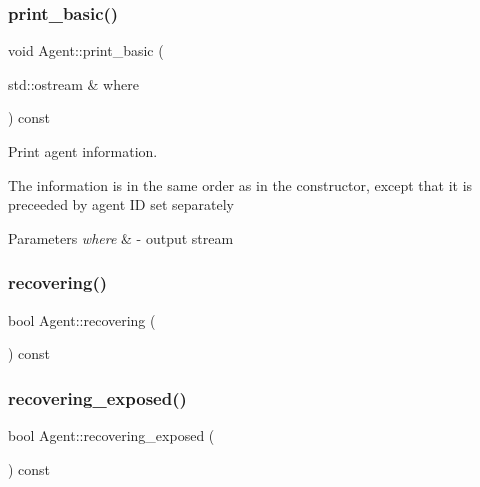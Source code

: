 \subsubsection{\texorpdfstring{print\+\_\+basic()}{print\_basic()}}
{\footnotesize\ttfamily void Agent\+::print\+\_\+basic (\begin{DoxyParamCaption}\item[{std\+::ostream \&}]{where }\end{DoxyParamCaption}) const}



Print agent information. 

The information is in the same order as in the constructor, except that it is preceeded by agent ID set separately 
\begin{DoxyParams}{Parameters}
{\em where} & -\/ output stream \\
\hline
\end{DoxyParams}
\mbox{\label{classAgent_adbe591f0156d55ec1eca37a7d9f75fe4}} 
\subsubsection{\texorpdfstring{recovering()}{recovering()}}
{\footnotesize\ttfamily bool Agent\+::recovering (\begin{DoxyParamCaption}{ }\end{DoxyParamCaption}) const\hspace{0.3cm}{\ttfamily [inline]}}

\mbox{\label{classAgent_a221f1afb3791e0f0fa9eaccaea2d00cb}} 
\subsubsection{\texorpdfstring{recovering\+\_\+exposed()}{recovering\_exposed()}}
{\footnotesize\ttfamily bool Agent\+::recovering\+\_\+exposed (\begin{DoxyParamCaption}{ }\end{DoxyParamCaption}) const\hspace{0.3cm}{\ttfamily [inline]}}

\mbox{\label{classAgent_ab04af1e2f506d5b9b050dc132c474065}} 
